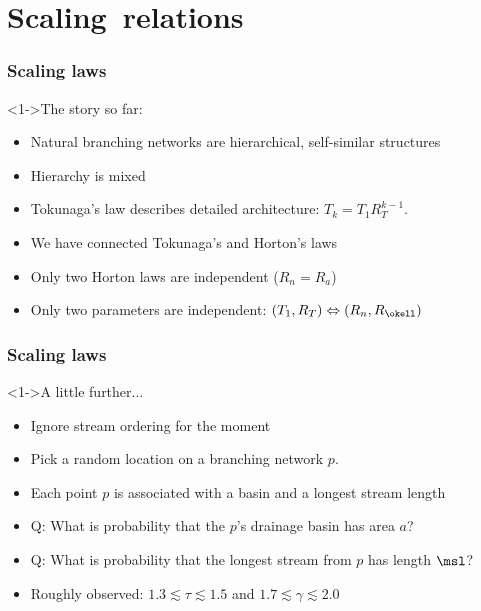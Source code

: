 


\section{Scaling\ relations}

\begin{frame}[label=]
  \frametitle{Scaling laws}

  \begin{block}<1->{The story so far:}
    \begin{itemize}
    \item<2-> Natural branching networks are \alert{hierarchical},
      \alert{self-similar} structures
    \item<3-> Hierarchy is \alert{mixed}
    \item<4-> Tokunaga's law describes detailed architecture: $T_k = T_1R_T^{k-1}$.
    \item<5-> We have connected Tokunaga's and Horton's laws
    \item<6-> Only two Horton laws are independent ($R_n = R_a$)
    \item<7-> Only \alert{two} parameters are \alert{independent}: $(T_1,R_T) \Leftrightarrow (R_n,R_\okell)$
    \end{itemize}
  \end{block}
  
\end{frame}

\begin{frame}[label=]
  \frametitle{Scaling laws}

  \begin{block}<1->{A little further...}
    \begin{itemize}
    \item<2-> Ignore stream ordering for the moment
    \item<3-> Pick a random location on a branching network $p$.
    \item<4-> Each point $p$ is associated with a basin and a longest stream length
    \item<5-> \alert{Q:} What is probability that the $p$'s drainage basin
      has area $a$?
    \item<6-> \alert{Q:} What is probability that the longest stream from
      $p$ has length $\msl$?
    \item<9->
      Roughly observed: $1.3 \lesssim \tau \lesssim 1.5$
      and  $1.7 \lesssim \gamma \lesssim 2.0$
    \end{itemize}
  \end{block}
  
\end{frame}

